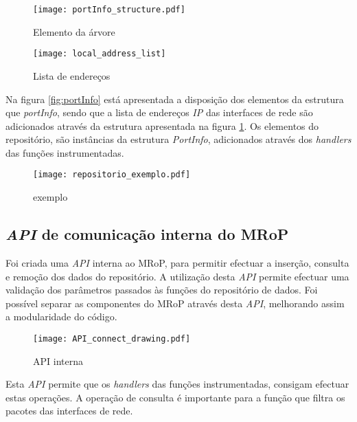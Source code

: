 \begin{figure}[ht]
\begin{minipage}[b]{0.5\linewidth}
\centering
\texttt{[image: portInfo\_structure.pdf]}
\caption{Elemento da árvore}
\label{fig:portInfo}
\end{minipage}
\hspace{0.5cm}
\begin{minipage}[b]{0.5\linewidth}
\centering
\texttt{[image: local\_address\_list]}
\caption{Lista de endereços}
\label{fig:local_address_list}
\end{minipage}
\end{figure}

Na figura \ref{fig:portInfo} está apresentada a disposição dos elementos da estrutura que \textit{portInfo}, sendo que a lista de endereços \textit{IP} das interfaces de rede são adicionados através da estrutura apresentada na figura \ref{fig:local_address_list}.
Os elementos do repositório, são instâncias da estrutura \textit{PortInfo}, adicionados através dos \textit{handlers} das funções instrumentadas.


\begin{figure}[ht]
\centering
\texttt{[image: repositorio\_exemplo.pdf]}
\caption{exemplo}
\label{fig:repo_example}
\end{figure}

\subsection{\textit{API} de comunicação interna do MRoP}
\label{sub:repo_api}

Foi criada uma \textit{API} interna ao MRoP, para permitir efectuar a inserção, consulta e remoção dos dados do repositório.
A utilização desta \textit{API} permite efectuar uma validação dos parâmetros passados às funções do repositório de dados.
Foi possível separar as componentes do MRoP através desta \textit{API}, melhorando assim a modularidade do código.

\begin{figure}[ht]
\centering
\texttt{[image: API\_connect\_drawing.pdf]}
\caption{API interna}
\label{fig:api_connect}
\end{figure}

Esta \textit{API} permite que os \textit{handlers} das funções instrumentadas, consigam efectuar estas operações.
A operação de consulta é importante para a função que filtra os pacotes das interfaces de rede.

